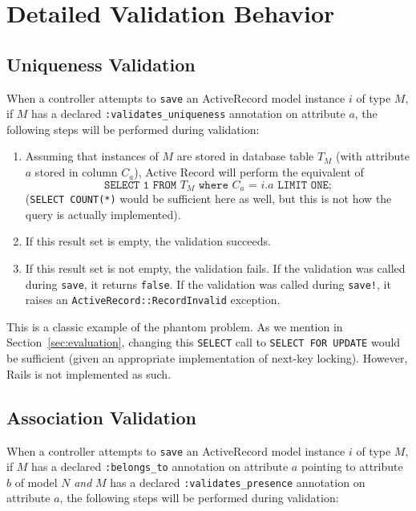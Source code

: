 \section{Detailed Validation Behavior}

\subsection{Uniqueness Validation}
\label{sec:appendix-uniqueness-behavior}

When a controller attempts to \texttt{save} an ActiveRecord model instance $i$ of type $M$, if $M$ has a declared \texttt{:validates\_uniqueness} annotation on attribute $a$, the following steps will be performed during validation:

\begin{enumerate} 
\small

\item Assuming that instances of $M$ are stored in database table $T_M$ (with attribute $a$ stored in column $C_a$), Active Record will perform the equivalent of $$\texttt{SELECT 1 FROM $T_M$ where $C_a$ = $i.a$ LIMIT ONE;}$$ (\texttt{SELECT COUNT(*)} would be sufficient here as well, but this is not how the query is actually implemented).

\item If this result set is empty, the validation succeeds.

\item If this result set is not empty, the validation fails. If the validation was called during \texttt{save}, it returns \texttt{false}. If the validation was called during \texttt{save!}, it raises an \texttt{ActiveRecord::RecordInvalid} exception.

\end{enumerate}

This is a classic example of the phantom problem. As we mention in Section~\ref{sec:evaluation}, changing this \texttt{SELECT} call to \texttt{SELECT FOR UPDATE} would be sufficient (given an appropriate implementation of next-key locking). However, Rails is not implemented as such.

\subsection{Association Validation}
\label{sec:appendix-association-behavior}

 When a controller attempts to \texttt{save} an ActiveRecord model instance $i$ of type $M$, if $M$ has a declared \texttt{:belongs\_to} annotation on attribute $a$ pointing to attribute $b$ of model $N$ \textit{and} $M$ has a declared \texttt{:validates\_presence} annotation on attribute $a$, the following steps will be performed during validation:

